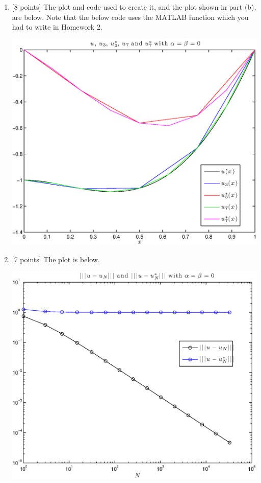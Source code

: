 \begin{solution}
\begin{enumerate}
\item {[8 points]} The plot and code used to create it, and the plot shown in part (b), are below. Note that the below code uses the MATLAB function which you had to write in Homework 2.

\begin{center}
\includegraphics[scale=0.7]{hw36a.eps}
\end{center}



\item {[7 points]} The plot is below.

\begin{center}
\includegraphics[scale=0.7]{hw36b.eps}
\end{center}


\end{enumerate}
\end{solution}
